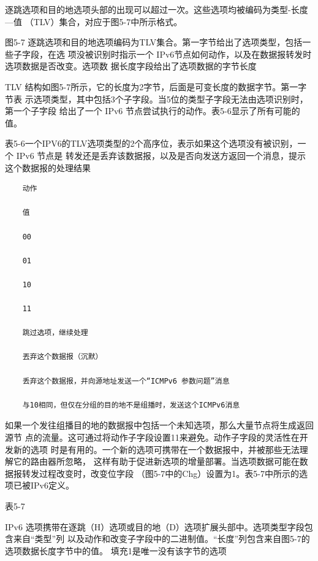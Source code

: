 逐跳选项和目的地选项头部的出现可以超过一次。这些选项均被编码为类型-长度—值
（TLV）集合，对应于图5-7中所示格式。

图5-7 逐跳选项和目的地选项编码为TLV集合。第一字节给出了选项类型，包括一些子字段，在选
项没被识别时指示一个 IPv6节点如何动作，以及在数据报转发时选项数据是否改变。选项数
据长度字段给出了选项数据的字节长度

TLV 结构如图5-7所示，它的长度为2字节，后面是可变长度的数据字节。第一字节表
示选项类型，其中包括3个子字段。当5位的类型子字段无法由选项识别时，第一个子字段
给出了一个 IPv6 节点尝试执行的动作。表5-6显示了所有可能的值。

表5-6一个IPV6的TLV选项类型的2个高序位，表示如果这个选项没有被识别，一个 IPv6 节点是
转发还是丢弃该数据报，以及是否向发送方返回一个消息，提示这个数据报的处理结果

\begin{verbatim}
    动作
    
    值
    
    00
    
    01
    
    10
    
    11
    
    跳过选项，继续处理
    
    丟弃这个数据报（沉默）
    
    丢弃这个数据报，并向源地址发送一个“ICMPv6 参数问题”消息
    
    与10相同，但仅在分组的目的地不是组播时，发送这个ICMPv6消息
\end{verbatim}

如果一个发往组播目的地的数据报中包括一个未知选项，那么大量节点将生成返回源节
点的流量。这可通过将动作子字段设置11来避免。动作子字段的灵活性在开发新的选项
时是有用的。一个新的选项可携带在一个数据报中，并被那些无法理解它的路由器所忽略，
这样有助于促进新选项的增量部署。当选项数据可能在数据报转发过程改变时，改变位字段
（图5-7中的Chg）设置为1。表5-7中所示的选项已被IPv6定义。

表5-7

IPv6 选项携带在逐跳（H）选项或目的地（D）选项扩展头部中。选项类型字段包含来自“类型”列
以及动作和改变子字段中的二进制值。“长度”列包含来自图5-7的选项数据长度字节中的值。
填充1是唯一没有该字节的选项

